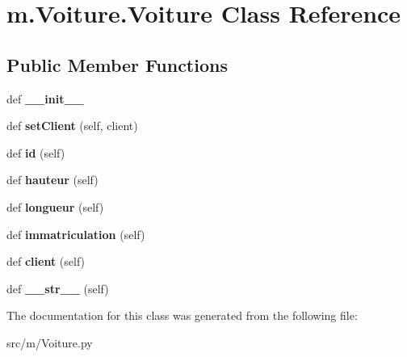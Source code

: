 \hypertarget{classm_1_1_voiture_1_1_voiture}{}\section{m.\+Voiture.\+Voiture Class Reference}
\label{classm_1_1_voiture_1_1_voiture}
\subsection*{Public Member Functions}
\begin{DoxyCompactItemize}
\item 
\hypertarget{classm_1_1_voiture_1_1_voiture_a2448f014ebf603191e47909ecc94131a}{}def {\bfseries \+\_\+\+\_\+init\+\_\+\+\_\+}\label{classm_1_1_voiture_1_1_voiture_a2448f014ebf603191e47909ecc94131a}

\item 
\hypertarget{classm_1_1_voiture_1_1_voiture_aaefa0c14a0298a7e32eb19e5dd916cf8}{}def {\bfseries set\+Client} (self, client)\label{classm_1_1_voiture_1_1_voiture_aaefa0c14a0298a7e32eb19e5dd916cf8}

\item 
\hypertarget{classm_1_1_voiture_1_1_voiture_a8b8bdc4ffae8afe641830f1e5c4b5f25}{}def {\bfseries id} (self)\label{classm_1_1_voiture_1_1_voiture_a8b8bdc4ffae8afe641830f1e5c4b5f25}

\item 
\hypertarget{classm_1_1_voiture_1_1_voiture_a7ac81942317cbb67c429769abef22c10}{}def {\bfseries hauteur} (self)\label{classm_1_1_voiture_1_1_voiture_a7ac81942317cbb67c429769abef22c10}

\item 
\hypertarget{classm_1_1_voiture_1_1_voiture_adae4cec967e47ac086eae5988f766dac}{}def {\bfseries longueur} (self)\label{classm_1_1_voiture_1_1_voiture_adae4cec967e47ac086eae5988f766dac}

\item 
\hypertarget{classm_1_1_voiture_1_1_voiture_ae782be05540d25072fd8faae805bad10}{}def {\bfseries immatriculation} (self)\label{classm_1_1_voiture_1_1_voiture_ae782be05540d25072fd8faae805bad10}

\item 
\hypertarget{classm_1_1_voiture_1_1_voiture_a77b3757f37837a0f6c6354bdcdd5ff33}{}def {\bfseries client} (self)\label{classm_1_1_voiture_1_1_voiture_a77b3757f37837a0f6c6354bdcdd5ff33}

\item 
\hypertarget{classm_1_1_voiture_1_1_voiture_aafe55e09440c657d7b614385d8f5231f}{}def {\bfseries \+\_\+\+\_\+str\+\_\+\+\_\+} (self)\label{classm_1_1_voiture_1_1_voiture_aafe55e09440c657d7b614385d8f5231f}

\end{DoxyCompactItemize}


The documentation for this class was generated from the following file\+:\begin{DoxyCompactItemize}
\item 
src/m/Voiture.\+py\end{DoxyCompactItemize}
